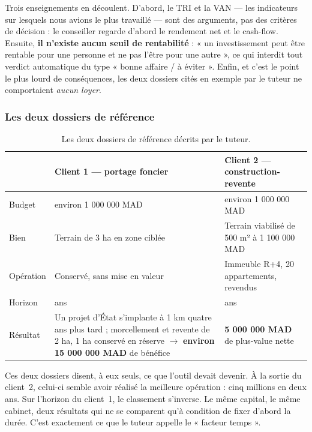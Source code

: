 \documentclass[12pt,a4paper]{article}
\begin{document}
Trois enseignements en découlent. D'abord, le TRI et la VAN --- les indicateurs
sur lesquels nous avions le plus travaillé --- sont des arguments, pas des
critères de décision : le conseiller regarde d'abord le rendement net et le
cash-flow. Ensuite, \textbf{il n'existe aucun seuil de rentabilité} : « un
investissement peut être rentable pour une personne et ne pas l'être pour une
autre », ce qui interdit tout verdict automatique du type « bonne affaire / à
éviter ». Enfin, et c'est le point le plus lourd de conséquences, les deux
dossiers cités en exemple par le tuteur ne comportaient \emph{aucun loyer}.

\subsubsection{Les deux dossiers de référence}

\begin{table}[H]
	\centering
	\small
	\renewcommand{\arraystretch}{1.40}
	\begin{tabular}{|>{\raggedright\arraybackslash}p{2.6cm}|>{\raggedright\arraybackslash}p{5.9cm}|>{\raggedright\arraybackslash}p{5.9cm}|}
		\hline
		\rowcolor{eccblue!15}
		& \textbf{\color{eccblue}Client 1 --- portage foncier} &
		\textbf{\color{eccblue}Client 2 --- construction-revente} \\
		\hline
		\rowcolor{white}
		Budget & environ 1 000 000 MAD & environ 1 000 000 MAD \\
		\hline
		\rowcolor{gray!8}
		Bien & Terrain de 3 ha en zone ciblée & Terrain viabilisé de 500 m²
		à 1 100 000 MAD \\
		\hline
		\rowcolor{white}
		Opération & Conservé, sans mise en valeur & Immeuble R+4, 20 appartements,
		revendus \\
		\hline
		\rowcolor{gray!8}
		Horizon & 10 ans & 2 ans \\
		\hline
		\rowcolor{white}
		Résultat & Un projet d'État s'implante à 1 km quatre ans plus tard ;
		morcellement et revente de 2 ha, 1 ha conservé en réserve $\rightarrow$
		\textbf{environ 15 000 000 MAD} de bénéfice &
		\textbf{5 000 000 MAD} de plus-value nette \\
		\hline
	\end{tabular}
	\caption{Les deux dossiers de référence décrits par le tuteur.}
\end{table}

Ces deux dossiers disent, à eux seuls, ce que l'outil devait devenir. À la sortie
du client~2, celui-ci semble avoir réalisé la meilleure opération : cinq millions
en deux ans. Sur l'horizon du client~1, le classement s'inverse. Le même capital,
le même cabinet, deux résultats qui ne se comparent qu'à condition de fixer
d'abord la durée. C'est exactement ce que le tuteur appelle le « facteur temps ».
\end{document}
